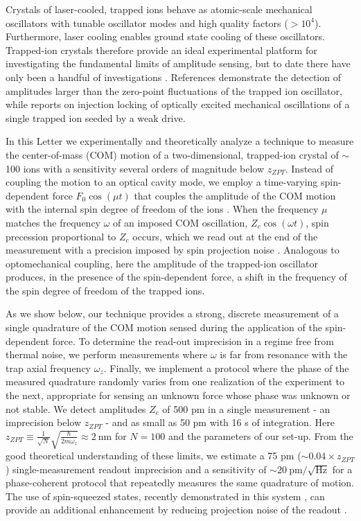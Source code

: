 \documentclass[aps,prl,twocolumn,superscriptaddress,floatfix,nofootinbib]{revtex4-1}
\begin{document}
Crystals of laser-cooled, trapped ions behave as atomic-scale mechanical oscillators \citep{Jost2009,Biercuk2010,Sawyer2012} with tunable oscillator modes and high quality factors ($ > 10^4$). Furthermore, laser cooling enables ground state cooling of these oscillators. Trapped-ion crystals therefore provide an ideal experimental platform for investigating the fundamental limits of amplitude sensing, but to date there have only been a handful of investigations \citep{Biercuk2010,Sawyer2012,Shaniv2016,Knunz2010}. References \citep{Biercuk2010,Sawyer2012,Shaniv2016} demonstrate the detection of amplitudes larger than the zero-point fluctuations of the trapped ion oscillator, while \citep{Knunz2010} reports on injection locking of optically excited mechanical oscillations of a single trapped ion seeded by a weak drive.

In this Letter we experimentally and theoretically analyze a technique to measure the center-of-mass (COM) motion of a two-dimensional, trapped-ion crystal of $\sim$100 ions with a sensitivity several orders of magnitude below $z_{ZPT}$. Instead of coupling the motion to an optical cavity mode, we employ a time-varying spin-dependent force $F_0\cos\left(\mu t\right)$ that couples the amplitude of the COM motion with the internal spin degree of freedom of the ions \citep{Sawyer2014,Ivanov2016}. When the frequency $\mu$ matches the frequency $\omega$ of an imposed COM oscillation, $Z_{c}\cos\left(\omega t\right)$, spin precession proportional to $Z_{c}$ occurs, which we read out at the end of the measurement with a precision imposed by spin projection noise \citep{Itano1993}. Analogous to optomechanical coupling, here the amplitude of the trapped-ion oscillator produces, in the presence of the spin-dependent force, a shift in the frequency of the spin degree of freedom of the trapped ions. 

As we show below, our technique provides a strong, discrete measurement of a single quadrature of the COM motion sensed during the application of the spin-dependent force. To determine the read-out imprecision in a regime free from thermal noise, we perform measurements where $\omega$ is far from resonance with the trap axial frequency $\omega_z$. Finally, we implement a protocol where the phase of the measured quadrature randomly varies from one realization of the experiment to the next, appropriate for sensing an unknown force whose phase was unknown or not stable. We detect amplitudes $Z_c$ of 500 pm in a single measurement - an imprecision below $z_{ZPT}$ - and as small as 50 pm with 16 s of integration. Here $z_{ZPT} \equiv \frac{1}{\sqrt{N}}\sqrt{\frac{\hbar}{2m\omega_z}} \approx 2\:\mathrm{nm}$ for $N = 100$ and the parameters of our set-up. From the good theoretical understanding of these limits, we estimate a 75 pm ($\sim 0.04 \times z_{ZPT}$) single-measurement readout imprecision and a sensitivity of $\sim 20\: \mathrm{pm}/\sqrt{\mathrm{Hz}}$ for a phase-coherent protocol that repeatedly measures the same quadrature of motion. The use of spin-squeezed states, recently demonstrated in this system \citep{Bohnet2015}, can provide an additional enhancement by reducing projection noise of the readout .
\end{document}
